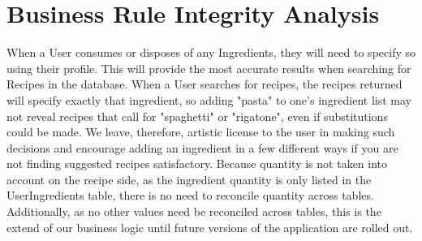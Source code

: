 \documentclass{article}
\begin{document}
\section{Business Rule Integrity Analysis}
	When a User consumes or disposes of any Ingredients, they will need to specify so using their profile. This will provide the most accurate results when searching for Recipes in the database.
	When a User searches for recipes, the recipes returned will specify exactly that ingredient, so adding "pasta" to one's ingredient list may not reveal recipes that call for "spaghetti" or "rigatone", even if substitutions could be made. We leave, therefore, artistic license to the user in making such decisions and encourage adding an ingredient in a few different ways if you are not finding suggested recipes satisfactory.
	Because quantity is not taken into account on the recipe side, as the ingredient quantity is only listed in the UserIngredients table, there is no need to reconcile quantity across tables. Additionally, as no other values need be reconciled across tables, this is the extend of our business logic until future versions of the application are rolled out.
\newpage
{}
 
 

 
\end{document}
